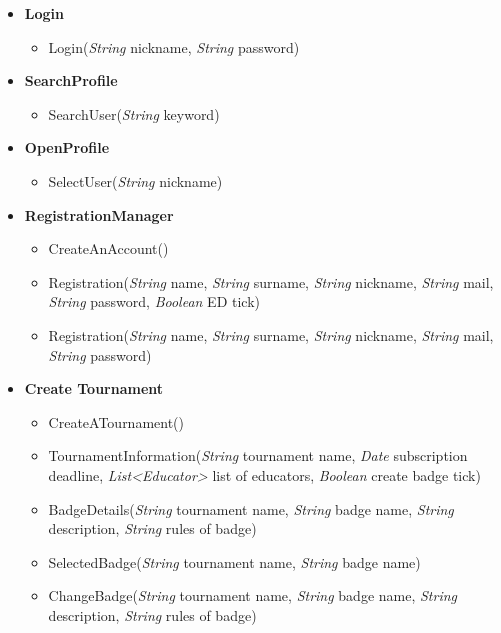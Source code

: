 \begin{itemize}
    \item \textbf{\textbf{Login}}
    \begin{itemize}

\item Login(\textit{String} nickname, \textit{String} password)
\end{itemize}
    \item \textbf{\textbf{SearchProfile}}


    \begin{itemize}

\item SearchUser(\textit{String} keyword)
\end{itemize}


    \item \textbf{\textbf{OpenProfile}}
    \begin{itemize}

\item SelectUser(\textit{String} nickname)

\end{itemize}


    \item \textbf{\textbf{RegistrationManager}}

\begin{itemize}
        \item CreateAnAccount()
        \item Registration(\textit{String} name, \textit{String} surname, \textit{String} nickname, \textit{String} mail, \textit{String} password, \textit{Boolean}  ED tick)
        \item Registration(\textit{String} name, \textit{String} surname, \textit{String} nickname, \textit{String} mail, \textit{String} password)
\end{itemize}

    \item \textbf{\textbf{Create Tournament}}

\begin{itemize}
        \item CreateATournament()
        \item TournamentInformation(\textit{String} tournament name, \textit{Date} subscription deadline, \textit{List\textless Educator\textgreater}  list of educators, \textit{Boolean} create badge tick)
        \item BadgeDetails(\textit{String} tournament name, \textit{String} badge name, \textit{String} description, \textit{String} rules of badge)
        \item SelectedBadge(\textit{String} tournament name, \textit{String} badge name)
        \item ChangeBadge(\textit{String} tournament name, \textit{String} badge name, \textit{String} description, \textit{String} rules of badge)
\end{itemize}


\end{itemize}
